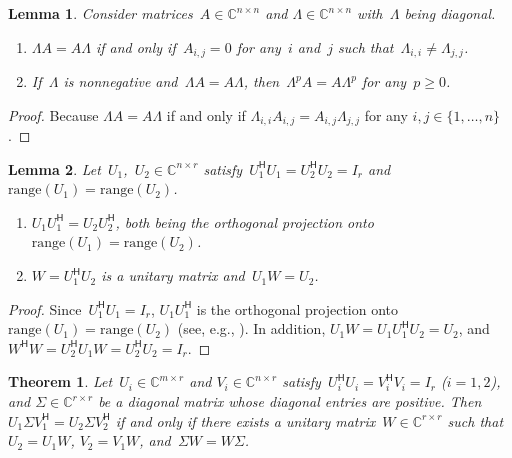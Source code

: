 \documentclass[11pt,a4paper]{article}  %
\numberwithin{equation}{section}
\newtheorem{theorem}{Theorem}%
\newtheorem{lemma}{Lemma}%
\theoremstyle{definition}
\def\CC{\mathbb{C}}
\newcommand{\hmt}{{\scriptscriptstyle{{\mathsf{H}}}}}
\newcommand{\range}{\mathrm{range}}
\newcommand{\eg}{{e.g.}}
\begin{document}
\begin{lemma}
  \label{lem:commute}
  Consider matrices~$A \in \CC^{n\times n}$ and $\Lambda \in \CC^{n\times n}$ with~$\Lambda$ being diagonal.
  \begin{enumerate}[leftmargin=1.5em]
  \item $\Lambda A = A\Lambda$ if and only if~$A_{i,j} = 0$ for any~$i$ and~$j$ such that~$\Lambda_{i,i}\neq \Lambda_{j,j}$.
  \item If~$\Lambda$ is nonnegative and~$\Lambda A = A\Lambda$, then~$\Lambda^p A = A \Lambda^p$ for
    any~$p\ge 0$.
  \end{enumerate}
\end{lemma}

\begin{proof} Because
$\Lambda A = A \Lambda$ if and only if
$\Lambda_{i,i} A_{i,j} = A_{i,j} \Lambda_{j,j}$ for any $i,j\in\{1, \dots, n\}$.
\end{proof}

\begin{lemma}
  \label{lem:unitary}
  Let~$U_1$,~$U_2 \in \CC^{n\times r}$ satisfy~$U_1^\hmt U_1 = U_2^\hmt U_2
  = I_r$ and~$\range(U_1) = \range(U_2)$.
  \begin{enumerate}[leftmargin=1.5em]
    \item $U_1U_1^\hmt = U_2U_2^\hmt$, both being the orthogonal projection onto~$\range(U_1)
      = \range(U_2)$.
    \item $W=U_1^\hmt U_2$ is a unitary matrix and~$U_1W = U_2$.
  \end{enumerate}
\end{lemma}

\begin{proof}
  Since~$U_1^\hmt U_1 = I_r$, $U_1U_1^\hmt$ is the orthogonal projection onto~$\range(U_1)
  = \range(U_2)$ (see, \eg, \cite{Han_Neumann_2013}). In addition,
 $U_1 W = U_1 U_1^\hmt U_2 = U_2$, and $W^\hmt W = U_2^\hmt U_1 W = U_2^\hmt U_2 = I_r$.
\end{proof}


\begin{theorem}
  \label{th:svdunique}
  Let~$U_i\in \CC^{m\times r}$ and $V_i\in \CC^{n\times r}$ satisfy~$U_i^\hmt
  U_i=V_i^{\hmt} V_i = I_r$ \textnormal{(}$i=1,2$\textnormal{)}, and
  $\Sigma \in \CC^{r\times r}$ be a diagonal matrix whose diagonal entries are positive.
  Then~$U_1 \Sigma V_1^{\hmt} = U_2 \Sigma V_2^{\hmt}$ if and only if there exists
  a unitary matrix~$W\in\CC^{r\times r}$ such that~$U_2=U_1 W$, $V_2 = V_1 W$, and~$\Sigma
  W = W\Sigma$.
\end{theorem}
\end{document}
